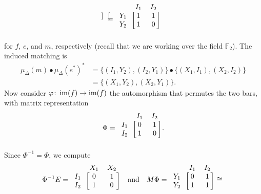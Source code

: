 \begin{example}
\begin{gather*}
\begin{blockarray}{c cc}
\begin{block}{c [cc]}
    \end{block}
  \end{blockarray}
  = \begin{blockarray}{c cc}
    & I_1 & I_2 \\
    \begin{block}{c [cc]}
      Y_1 & 1 & 1 \\
      Y_2 & 1 & 0 \\
    \end{block}
  \end{blockarray}
  \end{gather*}
  for $f$, $e$, and $m$, respectively (recall that we are working over the field $\mathbb{F}_2$). The induced matching is
  \begin{align*}
    \mu_\Delta(m) \bullet \mu_\Delta(e^*)^* & = \{(I_1, Y_2), (I_2, Y_1)\} \bullet \{(X_1, I_1), (X_2, I_2)\} \\
    & = \{(X_1, Y_2), (X_2, Y_1)\}.
  \end{align*}
  Now consider $\varphi \colon \operatorname{im}(f) \to \operatorname{im}(f)$ the automorphism that permutes the two bars, with matrix representation
  \[
  \Phi = \begin{blockarray}{c cc}
    & I_1 & I_2 \\
    \begin{block}{c [cc]}
      I_1 & 0 & 1 \\
      I_2 & 1 & 0 \\
    \end{block}
  \end{blockarray}.
  \]
  Since $\Phi^{-1} = \Phi$, we compute
  \[
    \Phi^{-1} E = \begin{blockarray}{c cc}
      & X_1 & X_2 \\
      \begin{block}{c [cc]}
        I_1 & 0 & 1 \\
        I_2 & 1 & 0 \\
      \end{block}
    \end{blockarray}
    \quad \text{and} \quad
    M \Phi = \begin{blockarray}{c cc}
      & I_1 & I_2 \\
      \begin{block}{c [cc]}
        Y_1 & 0 & 1 \\
        Y_2 & 1 & 1 \\
      \end{block}
    \end{blockarray}
    \cong \begin{blockarray}{c cc}

\end{blockarray}\]
\end{example}
